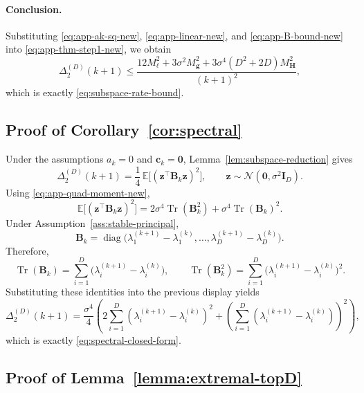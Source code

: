 \documentclass{article}
\begin{document}
\paragraph{Conclusion.}
Substituting \eqref{eq:app-ak-sq-new}, \eqref{eq:app-linear-new}, and \eqref{eq:app-B-bound-new} into \eqref{eq:app-thm-step1-new}, we obtain
\[
\Delta_2^{(D)}(k+1)
\le
\frac{
12M_\ell^2
+
3\sigma^2M_{\mathbf g}^2
+
3\sigma^4(D^2+2D)M_{\mathbf H}^2
}{(k+1)^2},
\]
which is exactly \eqref{eq:subspace-rate-bound}.

\subsection{Proof of Corollary~\ref{cor:spectral}}

Under the assumptions $a_k=0$ and $\mathbf c_k=\mathbf 0$, Lemma~\ref{lem:subspace-reduction} gives
\[
\Delta_2^{(D)}(k+1)
=
\frac14\,
\mathbb E\bigl[(\mathbf z^\top\mathbf B_k\mathbf z)^2\bigr],
\qquad
\mathbf z\sim\mathcal N(\mathbf 0,\sigma^2\mathbf I_D).
\]
Using \eqref{eq:app-quad-moment-new},
\[
\mathbb E\bigl[(\mathbf z^\top\mathbf B_k\mathbf z)^2\bigr]
=
2\sigma^4\operatorname{Tr}(\mathbf B_k^2)
+
\sigma^4\operatorname{Tr}(\mathbf B_k)^2.
\]
Under Assumption~\ref{ass:stable-principal},
\[
\mathbf B_k
=
\operatorname{diag}\bigl(
\lambda_1^{(k+1)}-\lambda_1^{(k)},
\dots,
\lambda_D^{(k+1)}-\lambda_D^{(k)}
\bigr).
\]
Therefore,
\[
\operatorname{Tr}(\mathbf B_k)
=
\sum_{i=1}^D \bigl(\lambda_i^{(k+1)}-\lambda_i^{(k)}\bigr),
\qquad
\operatorname{Tr}(\mathbf B_k^2)
=
\sum_{i=1}^D \bigl(\lambda_i^{(k+1)}-\lambda_i^{(k)}\bigr)^2.
\]
Substituting these identities into the previous display yields
\[
\Delta_2^{(D)}(k+1)
=
\frac{\sigma^4}{4}
\left(
2\sum_{i=1}^D (\lambda_i^{(k+1)}-\lambda_i^{(k)})^2
+
\left(
\sum_{i=1}^D (\lambda_i^{(k+1)}-\lambda_i^{(k)})
\right)^2
\right),
\]
which is exactly \eqref{eq:spectral-closed-form}.

\subsection{Proof of Lemma~\ref{lemma:extremal-topD}}
\end{document}
